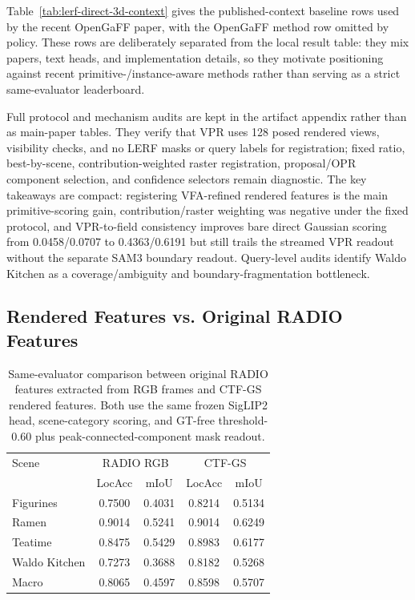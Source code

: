 \documentclass[10pt,twocolumn,letterpaper]{article}
\newcommand{\method}{CTF-GS}
\begin{document}
Table~\ref{tab:lerf-direct-3d-context} gives the published-context baseline
rows used by the recent OpenGaFF paper, with the OpenGaFF method row omitted by
policy. These rows are deliberately separated from the local result table: they
mix papers, text heads, and implementation details, so they motivate positioning
against recent primitive-/instance-aware methods rather than serving as a strict
same-evaluator leaderboard.

Full protocol and mechanism audits are kept in the artifact appendix rather
than as main-paper tables. They verify that VPR uses 128 posed rendered views,
visibility checks, and no LERF masks or query labels for registration; fixed
ratio, best-by-scene, contribution-weighted raster registration, proposal/OPR
component selection, and confidence selectors remain diagnostic. The key
takeaways are compact: registering VFA-refined rendered features is the main
primitive-scoring gain, contribution/raster weighting was negative under the
fixed protocol, and VPR-to-field consistency improves bare direct Gaussian
scoring from 0.0458/0.0707 to 0.4363/0.6191 but still trails the streamed VPR
readout without the separate SAM3 boundary readout. Query-level audits identify
Waldo Kitchen as a coverage/ambiguity and boundary-fragmentation bottleneck.

\subsection{Rendered Features vs. Original RADIO Features}

\begin{table}[t]
\centering
\caption{Same-evaluator comparison between original RADIO features extracted
from RGB frames and \method{} rendered features. Both use the same frozen
SigLIP2 head, scene-category scoring, and GT-free threshold-0.60 plus
peak-connected-component mask readout.}
\label{tab:teacher_vs_rendered}
\begin{tabular}{lcccc}
\toprule
Scene & \multicolumn{2}{c}{RADIO RGB} & \multicolumn{2}{c}{\method{}} \\
 & LocAcc & mIoU & LocAcc & mIoU \\
\midrule
Figurines & 0.7500 & 0.4031 & 0.8214 & 0.5134 \\
Ramen & 0.9014 & 0.5241 & 0.9014 & 0.6249 \\
Teatime & 0.8475 & 0.5429 & 0.8983 & 0.6177 \\
Waldo Kitchen & 0.7273 & 0.3688 & 0.8182 & 0.5268 \\
\midrule
Macro & 0.8065 & 0.4597 & 0.8598 & 0.5707 \\
\bottomrule
\end{tabular}
\end{table}
\end{document}
